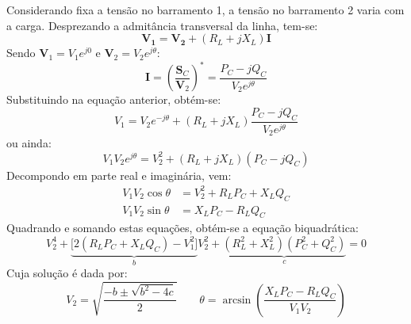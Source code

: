 \vspace{-0.75em}
\noindent Considerando fixa a tensão no barramento 1, a tensão no barramento 2 varia com a carga. Desprezando a admitância transversal da linha, tem-se:
$$
    \mathbf{V_1} = \mathbf{V_2} + (R_L + j X_L) \mathbf{I} 
$$
\noindent Sendo \(\mathbf{V}_1 = V_1 e^{j0}\) e \(\mathbf{V}_2 = V_2 e^{j\theta}\):
$$
    \mathbf{I} = \left(\frac{\mathbf{S}_C}{\mathbf{V}_2}\right)^* = \frac{P_C - jQ_C}{V_2 e^{j\theta}} 
$$
Substituindo na equação anterior, obtém-se:
$$
    V_1 = V_2 e^{-j\theta} + (R_L + jX_L) \frac{P_C - jQ_C}{V_2 e^{j\theta}}
$$
ou ainda:
$$
    V_1 V_2 e^{j\theta} = V_2^2 + (R_L + jX_L) (P_C - jQ_C) 
$$
Decompondo em parte real e imaginária, vem:
$$
\begin{aligned}
    V_1 V_2 \cos \theta &= V_2^2 + R_L P_C + X_L Q_C  \\
    V_1 V_2 \sin \theta &= X_L P_C - R_L Q_C 
\end{aligned}
$$
Quadrando e somando estas equações, obtém-se a equação biquadrática:
$$
    V_2^4 + \underbrace{\Big[ 2 (R_L P_C + X_L Q_C) - V_1^2 \Big]}_{b} V_2^2 + \underbrace{(R_L^2 + X_L^2) (P_C^2 + Q_C^2)}_{c} = 0 
$$
Cuja solução é dada por:
$$
    V_2 = \sqrt{\frac{-b \pm \sqrt{b^2 - 4c}}{2}}\qquad 
    \theta = \arcsin\left(\frac{X_L P_C - R_L Q_C}{V_1 V_2}\right)
$$


